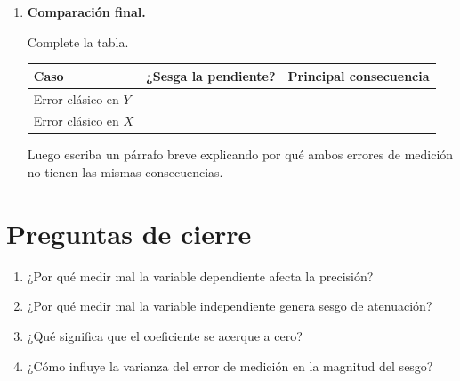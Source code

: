 \documentclass[11pt]{article}
\begin{document}
\begin{enumerate}[label=\textbf{Ejercicio \arabic*.}, leftmargin=*]
\item \textbf{Comparación final.}

Complete la tabla.

\begin{center}
\begin{tabular}{p{4cm}p{4cm}p{4cm}}
\toprule
Caso & ¿Sesga la pendiente? & Principal consecuencia \\
\midrule
Error clásico en $Y$ & & \\
Error clásico en $X$ & & \\
\bottomrule
\end{tabular}
\end{center}

Luego escriba un párrafo breve explicando por qué ambos errores de medición no tienen las mismas consecuencias.

\end{enumerate}

\section*{Preguntas de cierre}

\begin{enumerate}[label=\arabic*.]
    \item ¿Por qué medir mal la variable dependiente afecta la precisión?
    \item ¿Por qué medir mal la variable independiente genera sesgo de atenuación?
    \item ¿Qué significa que el coeficiente se acerque a cero?
    \item ¿Cómo influye la varianza del error de medición en la magnitud del sesgo?
\end{enumerate}
\end{document}
